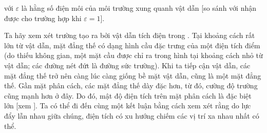 \noindent
với $\varepsilon$ là hằng số điện môi của môi trường xung quanh vật dẫn [so sánh với  nhận được cho trường hợp khi $\varepsilon=1$].

Ta hãy xem xét trường tạo ra bởi vật dẫn tích điện trong . Tại khoảng cách rất lớn từ vật dẫn, mặt đẳng thế có dạng hình cầu đặc trưng của một điện tích điểm (do thiếu không gian, một mặt cầu được chỉ ra trong hình tại khoảng cách nhỏ từ vật dẫn; các đường nét đứt là đường sức trường). Khi ta tiếp cận vật dẫn, các mặt đẳng thế trở nên càng lúc càng giống bề mặt vật dẫn, cũng là một mặt đẳng thế. Gần mặt phân cách, các mặt đẳng thế dày đặc hơn, từ đó, cường độ trường cũng mạnh hơn ở đây. Do đó, mật độ điện tích trên mặt phân cách là đặc biệt lớn [xem ]. Ta có thể đi đến cùng một kết luận bằng cách xem xét rằng do lực đẩy lẫn nhau giữa chúng, điện tích có xu hướng chiếm các vị trí xa nhau nhất có thể.

